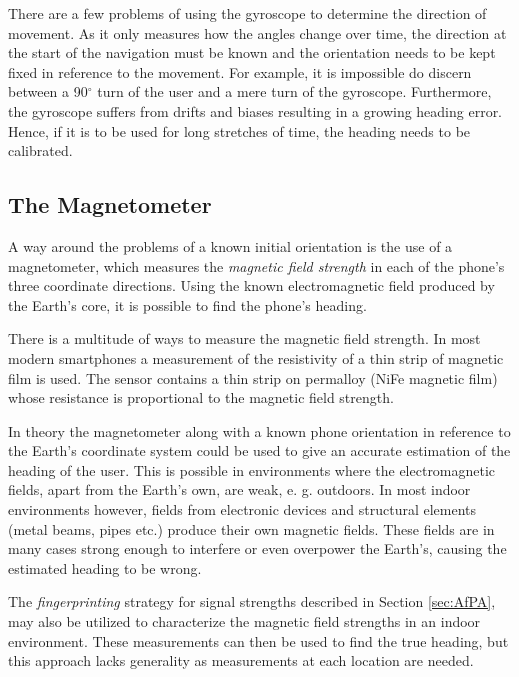 \documentclass{LTHthesis}
\begin{document}
There are a few problems of using the gyroscope to determine the direction of movement. As it only measures how the angles change over time, the direction at the start of the navigation must be known and the orientation needs to be kept fixed in reference to the movement. For example, it is impossible do discern between a 90$^\circ$ turn of the user and a mere turn of the gyroscope.  Furthermore, the gyroscope suffers from drifts and biases resulting in a growing heading error. Hence, if it is to be used for long stretches of time, the heading needs to be calibrated.
%
\subsection{The Magnetometer}
\label{subsec:mag}
%
A way around the problems of a known initial orientation is the use of a magnetometer, which measures the \emph{magnetic field strength} in each of the phone's three coordinate directions. Using the known electromagnetic field produced by the Earth's core, it is possible to find the phone's heading.

There is a multitude of ways to measure the magnetic field strength. In most modern smartphones a measurement of the resistivity of a thin strip of magnetic film is used. The sensor contains a thin strip on permalloy (NiFe magnetic film) whose resistance is proportional to the magnetic field strength.  

In theory the magnetometer along with a known phone orientation in reference to the Earth's coordinate system  could be used to give an accurate estimation of the heading of the user. This is possible in environments where the electromagnetic fields, apart from the Earth's own, are weak, e. g. outdoors. In most indoor environments however, fields from electronic devices and structural elements (metal beams, pipes etc.) produce their own magnetic fields. These fields are in many cases strong enough to interfere or even overpower the Earth's, causing the estimated heading to be wrong. 

The \emph{fingerprinting} strategy for signal strengths described in Section \ref{sec:AfPA}, may also be utilized to characterize the magnetic field strengths in an indoor environment. These measurements can then be used to find the true heading, but this approach lacks generality as measurements at each location are needed.  
%
\end{document}
